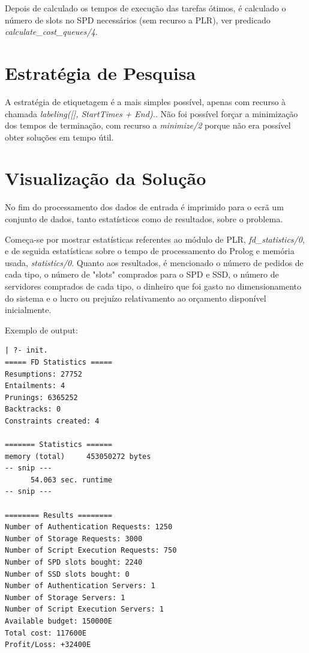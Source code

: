 \documentclass{llncs}
\begin{document}
Depois de calculado os tempos de execução das tarefas ótimos, é calculado o número de slots no SPD necessários (sem recurso a PLR), ver predicado \textit{calculate\_cost\_queues/4}.

\section{Estratégia de Pesquisa}\label{sec:Search Strategy}

A estratégia de etiquetagem é a mais simples possível, apenas com recurso à chamada \textit{labeling([], StartTimes + End).}. Não foi possível forçar a minimização dos tempos de terminação, com recurso a \textit{minimize/2} porque não era possível obter soluções em tempo útil.

\section{Visualização da Solução}\label{sec:Solution Presentation}

No fim do processamento dos dados de entrada é imprimido para o ecrã um conjunto de dados, tanto estatísticos como de resultados, sobre o problema.


Começa-se por mostrar estatísticas referentes ao módulo de PLR, \textit{fd\_statistics/0}, e de seguida estatísticas sobre o tempo de processamento do Prolog e memória usada, \textit{statistics/0}. Quanto aos resultados, é mencionado o número de pedidos de cada tipo, o número de "slots" comprados para o SPD e SSD, o número de servidores comprados de cada tipo, o dinheiro que foi gasto no dimensionamento do sistema e o lucro ou prejuízo relativamento ao orçamento disponível inicialmente.

Exemplo de output:
\begin{verbatim}
| ?- init.
===== FD Statistics =====
Resumptions: 27752
Entailments: 4
Prunings: 6365252
Backtracks: 0
Constraints created: 4

======= Statistics ======
memory (total)     453050272 bytes
-- snip ---
      54.063 sec. runtime
-- snip ---

======== Results ========
Number of Authentication Requests: 1250
Number of Storage Requests: 3000
Number of Script Execution Requests: 750
Number of SPD slots bought: 2240
Number of SSD slots bought: 0
Number of Authentication Servers: 1
Number of Storage Servers: 1
Number of Script Execution Servers: 1
Available budget: 150000E
Total cost: 117600E
Profit/Loss: +32400E
\end{verbatim}
\end{document}
